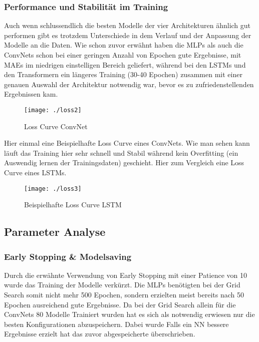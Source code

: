 \documentclass[acmtog, authorversion]{acmart} %
\begin{document}
\subsubsection{Performance und Stabilität im Training}
Auch wenn schlussendlich die besten Modelle der vier Architekturen ähnlich gut performen gibt es trotzdem Unterschiede in dem Verlauf und der Anpassung der Modelle an die Daten. Wie schon zuvor erwähnt haben die MLPs als auch die ConvNets schon bei einer geringen Anzahl von Epochen gute Ergebnisse, mit MAEs im niedrigen einstelligen Bereich geliefert, während bei den LSTMs und den Transformern ein längeres Training (30-40 Epochen) zusammen mit einer genauen Auswahl der Architektur notwendig war, bevor es zu zufriedenstellenden Ergebnissen kam.
\begin{figure}[H]
    \centering
    \texttt{[image: ./loss2]}
    \label{fig:sub7}
    \caption{Loss Curve ConvNet}
\end{figure}
Hier einmal eine Beispielhafte Loss Curve eines ConvNets. Wie man sehen kann läuft das Training hier sehr schnell und Stabil während kein Overfitting (ein Auswendig lernen der Trainingsdaten) geschieht.
Hier zum Vergleich eine Loss Curve eines LSTMs.
\begin{figure}[H]
    \centering
    \texttt{[image: ./loss3]}
    \label{fig:sub7}
    \caption{Beispielhafte Loss Curve LSTM}
\end{figure}


\subsection{Parameter Analyse}

\subsubsection{Early Stopping \& Modelsaving}
Durch die erwähnte Verwendung von Early Stopping mit einer Patience von 10 wurde das Training der Modelle verkürzt. 
Die MLPs benötigten bei der Grid Search somit nicht mehr 500 Epochen, sondern erzielten meist bereits nach 50 Epochen ausreichend gute Ergebnisse. 
Da bei der Grid Search allein für die ConvNets 80 Modelle Trainiert wurden hat es sich als notwendig erwiesen nur die besten Konfigurationen abzuspeichern. Dabei wurde Falls ein NN bessere Ergebnisse erzielt hat das zuvor abgespeicherte überschrieben. 
\end{document}

